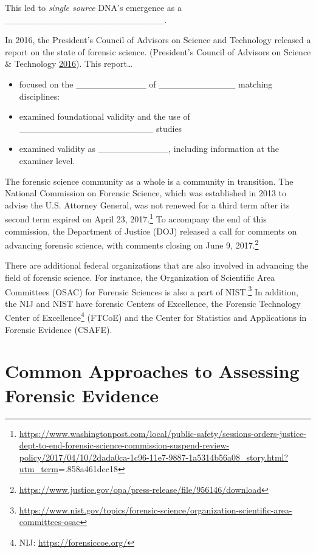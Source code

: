 \documentclass[]{book}
\providecommand{\tightlist}{%
  \setlength{\itemsep}{0pt}\setlength{\parskip}{0pt}}
\let\rmarkdownfootnote\footnote%
\def\footnote{\protect\rmarkdownfootnote}
\theoremstyle{definition}
\theoremstyle{definition}
\theoremstyle{remark}
\begin{document}
This led to \emph{single source} DNA's emergence as a
\_\_\_\_\_\_\_\_\_\_\_\_\_\_\_\_\_\_\_\_\_\_\_\_\_.

In 2016, the President's Council of Advisors on Science and Technology
released a report on the state of forensic science. (President's Council
of Advisors on Science \& Technology
\protect\hyperlink{ref-pcast}{2016}). This report\ldots{} \vspace{.1in}

\begin{itemize}
\tightlist
\item
  focused on the \_\_\_\_\_\_\_\_\_\_\_ of \_\_\_\_\_\_\_\_\_\_\_\_
  matching disciplines: \vspace{.1in}
\item
  examined foundational validity and the use of
  \_\_\_\_\_\_\_\_\_\_\_\_\_\_\_\_\_\_\_\_\_ studies \vspace{.1in}
\item
  examined validity as \_\_\_\_\_\_\_\_\_\_\_, including information at
  the examiner level.
\end{itemize}

The forensic science community as a whole is a community in transition.
The National Commission on Forensic Science, which was established in
2013 to advise the U.S. Attorney General, was not renewed for a third
term after its second term expired on April 23, 2017.\footnote{\url{https://www.washingtonpost.com/local/public-safety/sessions-orders-justice-dept-to-end-forensic-science-commission-suspend-review-policy/2017/04/10/2dada0ca-1c96-11e7-9887-1a5314b56a08_story.html?utm_term}=.858a461dec18}
To accompany the end of this commission, the Department of Justice (DOJ)
released a call for comments on advancing forensic science, with
comments closing on June 9, 2017.\footnote{\url{https://www.justice.gov/opa/press-release/file/956146/download}}

There are additional federal organizations that are also involved in
advancing the field of forensic science. For instance, the Organization
of Scientific Area Committees (OSAC) for Forensic Sciences is also a
part of NIST.\footnote{\url{https://www.nist.gov/topics/forensic-science/organization-scientific-area-committees-osac}}
In addition, the NIJ and NIST have forensic Centers of Excellence, the
Forensic Technology Center of Excellence\footnote{NIJ:
  \url{https://forensiccoe.org/}} (FTCoE) and the Center for Statistics
and Applications in Forensic Evidence (CSAFE).

\section{Common Approaches to Assessing Forensic
Evidence}\label{common-approaches-to-assessing-forensic-evidence}
\end{document}
